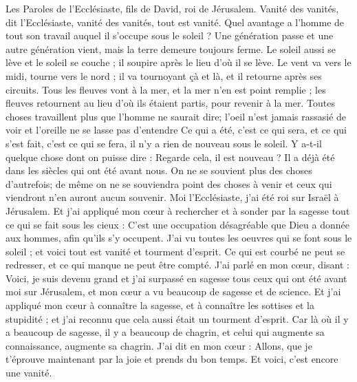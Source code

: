 \begin{multicols}{2}
\VerseOne{}Les Paroles de l'Ecclésiaste, fils de David, roi de Jérusalem.
Vanité des vanités, dit l'Ecclésiaste, vanité des vanités, tout est vanité.
Quel avantage a l'homme de tout son travail auquel il s'occupe sous le soleil ?
Une génération passe et une autre génération vient, mais la terre demeure toujours ferme.
Le soleil aussi se lève et le soleil se couche ; il soupire après le lieu d'où il se lève.
Le vent va vers le midi, tourne vers le nord ; il va tournoyant çà et là, et il retourne après ses circuits.
Tous les fleuves vont à la mer, et la mer n'en est point remplie ; les fleuves retournent au lieu d'où ils étaient partis, pour revenir à la mer. 
Toutes choses travaillent plus que l'homme ne saurait dire; l'oeil n'est jamais rassasié de voir et l'oreille ne se lasse pas d'entendre 
Ce qui a été, c'est ce qui sera, et ce qui s'est fait, c'est ce qui se fera, il n'y a rien de nouveau sous le soleil.
Y a-t-il quelque chose dont on puisse dire : Regarde cela, il est nouveau ? Il a déjà été dans les siècles qui ont été avant nous.
On ne se souvient plus des choses d'autrefois; de même on ne se souviendra point des choses à venir et ceux qui viendront n'en auront aucun souvenir. 
Moi l'Ecclésiaste, j'ai été roi sur Israël à Jérusalem.
Et j'ai appliqué mon cœur à rechercher et à sonder par la sagesse tout ce qui se fait sous les cieux : C'est une occupation désagréable que Dieu a donnée aux hommes, afin qu'ils s'y occupent.
J'ai vu toutes les oeuvres qui se font sous le soleil ; et voici tout est vanité et tourment d'esprit.
Ce qui est courbé ne peut se redresser, et ce qui manque ne peut être compté.
J'ai parlé en mon cœur, disant : Voici, je suis devenu grand et j'ai surpassé en sagesse tous ceux qui ont été avant moi sur Jérusalem, et mon cœur a vu beaucoup de sagesse et de science.
Et j'ai appliqué mon cœur à connaître la sagesse, et à connaître les sottises et la stupidité ; et j'ai reconnu que cela aussi était un tourment d'esprit.
Car là où il y a beaucoup de sagesse, il y a beaucoup de chagrin, et celui qui augmente sa connaissance, augmente sa chagrin.
\VerseOne{}J'ai dit en mon cœur : Allons, que je t'éprouve maintenant par la joie et prends du bon temps. Et voici, c'est encore une vanité.

\end{multicols}
